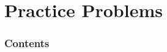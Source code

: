 \documentclass[dvipdfmx, 11pt, aspectratio=169]{beamer}   %
\begin{document}
\section{Practice Problems}
\begin{frame}
    \frametitle{Contents}
    \linespread{0.6}\selectfont
\end{frame}
\end{document}
